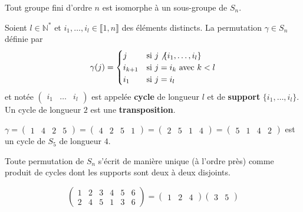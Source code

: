 	\begin{theorem}[Cayley]
		Tout groupe fini d'ordre $n$ est isomorphe à un sous-groupe de $S_n$.
	\end{theorem}

	\begin{definition}
		Soient $l \in \mathbb{N}^*$ et $i_1, \dots, i_l \in \llbracket 1, n \rrbracket$ des éléments distincts. La permutation $\gamma \in S_n$ définie par
		\[
			\gamma(j) =
			\begin{cases}
				j &\text{si } j \not \{ i_1, \dots, i_l \} \\
				i_{k+1} &\text{si } j = i_k \text{ avec } k<l \\
				i_1 &\text{si } j=i_l
			\end{cases}
		\]
		et notée $\begin{pmatrix} i_1 & \dots & i_l \end{pmatrix}$ est appelée \textbf{cycle} de longueur $l$ et de \textbf{support} $\{ i_1, \dots, i_l \}$. Un cycle de longueur $2$ est une \textbf{transposition}.
	\end{definition}

	\begin{example}
		$\gamma = \begin{pmatrix} 1 & 4 & 2 & 5 \end{pmatrix} = \begin{pmatrix} 4 & 2 & 5 & 1 \end{pmatrix} = \begin{pmatrix} 2 & 5 & 1 & 4 \end{pmatrix} = \begin{pmatrix} 5 & 1 & 4 & 2 \end{pmatrix}$ est un cycle de $S_5$ de longueur $4$.
	\end{example}

	\begin{theorem}
		Toute permutation de $S_n$ s'écrit de manière unique (à l'ordre près) comme produit de cycles dont les supports sont deux à deux disjoints.
	\end{theorem}

	\begin{example}
		\label{104-3}
		\[
			\begin{pmatrix}
				1 & 2 & 3 & 4 & 5 & 6 \\
				2 & 4 & 5 & 1 & 3 & 6
			\end{pmatrix}
			=
			\begin{pmatrix} 1 & 2 & 4 \end{pmatrix}\begin{pmatrix} 3 & 5 \end{pmatrix}
		\]
	\end{example}

